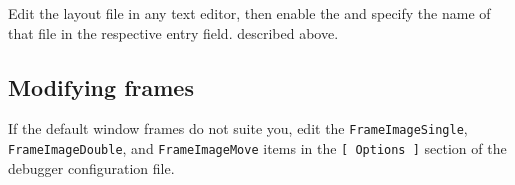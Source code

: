 Edit the layout file in any text editor, then enable the 
 and specify the name of
that file in the respective entry field.
described above.

\subsection{Modifying frames}

If the default window frames do not suite you, edit the \verb'FrameImageSingle',
\verb'FrameImageDouble', and \verb'FrameImageMove' items in the \verb'[ Options ]'
section of the debugger configuration file. 
